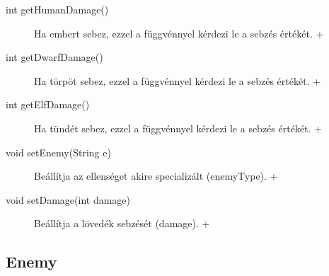 \begin{itemize}
\begin{description}
\item[int getHumanDamage()] Ha embert sebez, ezzel a függvénnyel kérdezi le a sebzés értékét. +
\item[int getDwarfDamage()] Ha törpöt sebez, ezzel a függvénnyel kérdezi le a sebzés értékét. +
\item[int getElfDamage()] Ha tündét sebez, ezzel a függvénnyel kérdezi le a sebzés értékét. +
\item[void setEnemy(String e)] Beállítja az ellenséget akire specializált (enemyType). +
\item[void setDamage(int damage)] Beállítja a lövedék sebzését (damage). +

	\end{description}
\end{itemize}


\subsection{Enemy}
